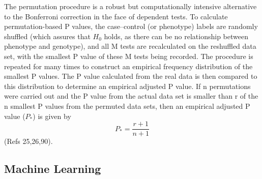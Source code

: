 
The permutation procedure is a robust but computationally intensive alternative to the Bonferroni correction in the face of dependent tests. To calculate permutation-based P values, the case–control (or phenotype) labels are randomly shuffled (which assures that $H_0$ holds, as there can be no relationship between phenotype and genotype), and all M tests are recalculated on the reshuffled data set, with the smallest P value of these M tests being recorded. The procedure is repeated for many times to construct an empirical frequency distribution of the smallest P values. The P value calculated from the real data is then compared to this distribution to determine an empirical adjusted P value. If n permutations were carried out and the P value from the actual data set is smaller than r of the n smallest P values from the permuted data sets, then an empirical adjusted P value ($P_{*}$) is given by $$P_{*} = \frac{r + 1}{n + 1}$$ (Refs 25,26,90).

\subsection{Machine Learning}
